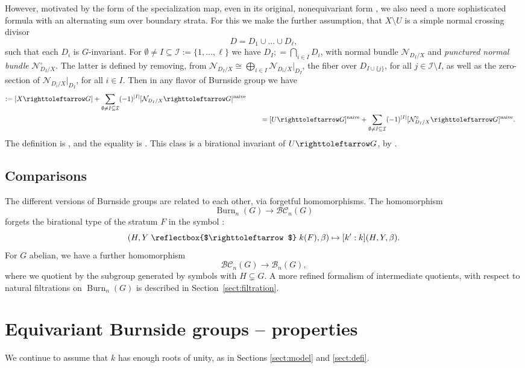 \documentclass[12pt,reqno]{amsart}
\theoremstyle{plain}
\theoremstyle{remark}
\theoremstyle{definition}
\numberwithin{equation}{section}
\newcommand{\cB}{{\mathcal B}}
\newcommand{\cI}{{\mathcal I}}
\newcommand{\BC}{{\mathcal B}{\mathcal C}}
\newcommand{\actsfromleft}{\mathrel{\reflectbox{$\righttoleftarrow$}}}
\newcommand{\actsfromright}{\righttoleftarrow}
\DeclareMathOperator{\Burn}{Burn}
\begin{document}
However, motivated by the form of the specialization map, even in its original, nonequivariant form \cite{KT},
we also need a more sophisticated formula with an alternating sum over boundary strata.
For this we make the further assumption, that $X\setminus U$ is a simple normal crossing divisor \[ D=D_1\cup\dots \cup D_\ell, \]
such that each $D_i$ is $G$-invariant.
For $\emptyset\ne I\subseteq \cI:=\{1,\dots,\ell\}$ we have $D_I;=\bigcap_{i\in I}D_i$,
with normal bundle $\mathcal{N}_{D_I/X}$
and \emph{punctured normal bundle} $\mathcal{N}_{D_I/X}^\circ$.
The latter is defined by removing, from $\mathcal{N}_{D_I/X}\cong \bigoplus_{i\in I}\mathcal{N}_{D_i/X}|_{D_I}$,
the fiber over $D_{I\cup\{j\}}$, for all $j\in \cI\setminus I$, as well as the zero-section of $\mathcal{N}_{D_i/X}|_{D_I}$, for all $i\in I$.
Then in any flavor of Burnside group we have
\begin{align*}
[&U\actsfromright G]:=
[X\actsfromright G]+\sum_{\emptyset\ne I\subseteq \cI}(-1)^{|I|}[\mathcal{N}_{D_I/X}\actsfromright G]^{\mathrm{naive}} \\
&\qquad=
[U\actsfromright G]^{\mathrm{naive}}+\sum_{\emptyset\ne I\subseteq \cI}(-1)^{|I|}[\mathcal{N}_{D_I/X}^\circ\actsfromright G]^{\mathrm{naive}}.
\end{align*}
The definition is \cite[Defn.\ 5.4]{BnG}, and the equality is \cite[Lemma 5.7]{BnG}.
This class is a birational invariant of $U\actsfromright G$, by \cite[Thm.\ 5.15]{BnG}.



\subsection{Comparisons}
\label{ss.comparisons}
The different versions of Burnside groups are related to each other, via forgetful homomorphisms. The homomorphism
$$
\Burn_n(G)\to \BC_n(G)
$$
forgets the birational type of the stratum $F$ in the symbol \cite[Prop.\ 8.2]{KT-struct}: 
$$
(H, Y\actsfromleft k(F), \beta) \mapsto [k':k](H, Y, \beta).
$$
For $G$ abelian, we 
have a further homomorphism \cite[Exa.\ 8.8]{KT-struct}
$$
\BC_n(G)\to \cB_n(G), 
$$
where we quotient by the subgroup generated by symbols with $H\subsetneq G$. 
A more refined formalism of intermediate quotients, with respect to natural filtrations on $\Burn_n(G)$ is described in Section~\ref{sect:filtration}.

\section{Equivariant Burnside groups -- properties}
\label{sect:first}
We continue to assume that $k$ has enough roots of unity, as in Sections \ref{sect:model} and \ref{sect:defi}.
\end{document}
